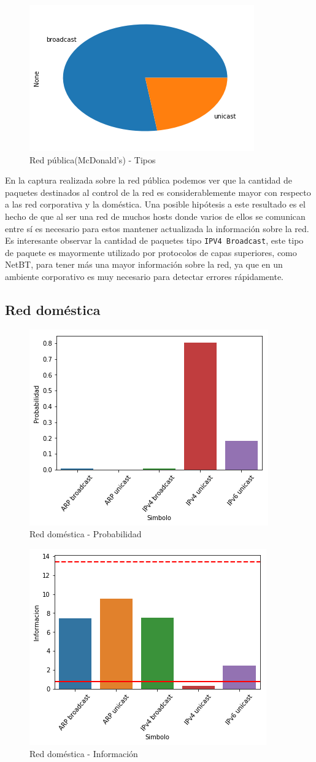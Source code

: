 \begin{figure}[H]
	\centering
	\includegraphics[width=.5\linewidth]{imagenes/mac_torta_tipos}
	\caption{Red pública(McDonald's) - Tipos}
\end{figure}

En la captura realizada sobre la red pública podemos ver que la cantidad de paquetes destinados al control de la red es considerablemente mayor con respecto a las red corporativa y la doméstica. Una posible hipótesis a este resultado es el hecho de que al ser una red de muchos hosts donde varios de ellos se comunican entre sí es necesario para estos mantener actualizada la información sobre la red. Es interesante observar la cantidad de paquetes tipo \texttt{IPV4 Broadcast}, este tipo de paquete es mayormente utilizado por protocolos de capas superiores, como NetBT, para tener más una mayor información sobre la red, ya que en un ambiente corporativo es muy necesario para detectar errores rápidamente.


\subsection{Red doméstica}

\begin{figure}[H]
	\centering
	\includegraphics[width=.5\linewidth]{imagenes/manu_casa_barras_prob}
	\caption{Red doméstica - Probabilidad}
\end{figure}

\begin{figure}[H]
	\centering
	\includegraphics[width=.5\linewidth]{imagenes/manu_casa_barras_info}
	\caption{Red doméstica - Información}
\end{figure}

